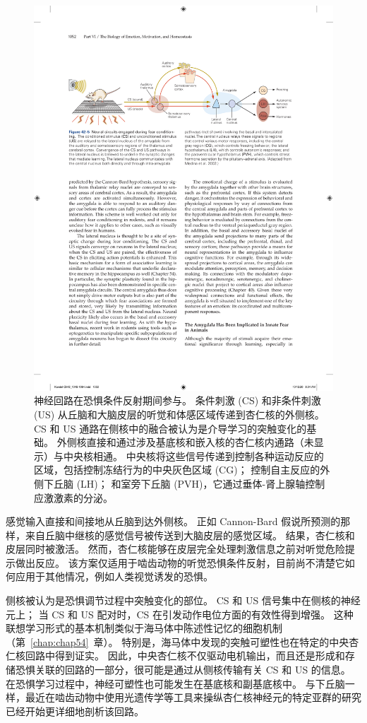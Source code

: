 \begin{figure}[htbp]
	\centering
	\includegraphics[width=0.95\linewidth]{chap42/fig_42_5}
	\caption{神经回路在恐惧条件反射期间参与。
		条件刺激 (CS) 和非条件刺激 (US) 从丘脑和大脑皮层的听觉和体感区域传递到杏仁核的外侧核。
		CS 和 US 通路在侧核中的融合被认为是介导学习的突触变化的基础。
		外侧核直接和通过涉及基底核和嵌入核的杏仁核内通路（未显示）与中央核相通。
		中央核将这些信号传递到控制各种运动反应的区域，包括控制冻结行为的中央灰色区域 (CG)；
		控制自主反应的外侧下丘脑 (LH)；
		和室旁下丘脑 (PVH)，它通过垂体-肾上腺轴控制应激激素的分泌\cite{medina2002parallels}。}
	\label{fig:42_5}
\end{figure}


感觉输入直接和间接地从丘脑到达外侧核。
正如 Cannon-Bard 假说所预测的那样，来自丘脑中继核的感觉信号被传送到大脑皮层的感觉区域。
结果，杏仁核和皮层同时被激活。
然而，杏仁核能够在皮层完全处理刺激信息之前对听觉危险提示做出反应。
该方案仅适用于啮齿动物的听觉恐惧条件反射，目前尚不清楚它如何应用于其他情况，例如人类视觉诱发的恐惧。


侧核被认为是恐惧调节过程中突触变化的部位。
CS 和 US 信号集中在侧核的神经元上；
当 CS 和 US 配对时，CS 在引发动作电位方面的有效性得到增强。
这种联想学习形式的基本机制类似于海马体中陈述性记忆的细胞机制（第~\ref{chap:chap54}~章）。
特别是，海马体中发现的突触可塑性也在特定的中央杏仁核回路中得到证实。
因此，中央杏仁核不仅驱动电机输出，而且还是形成和存储恐惧关联的回路的一部分，很可能是通过从侧核传输有关 CS 和 US 的信息。
在恐惧学习过程中，神经可塑性也可能发生在基底核和副基底核中。
与下丘脑一样，最近在啮齿动物中使用光遗传学等工具来操纵杏仁核神经元的特定亚群的研究已经开始更详细地剖析该回路。


